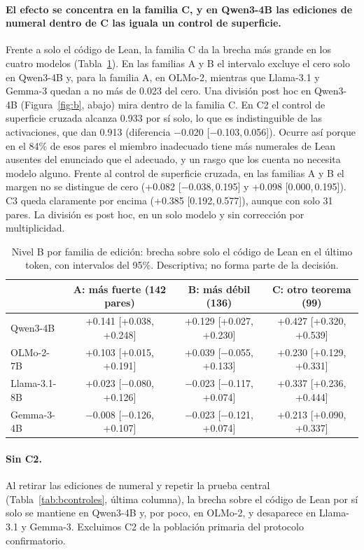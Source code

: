 \documentclass[10pt]{article}
\newcommand{\ic}[2]{[#1,\,#2]}
\begin{document}
\paragraph{El efecto se concentra en la familia C, y en Qwen3-4B las ediciones de numeral dentro de C las iguala un control de superficie.}
Frente a solo el código de Lean, la familia C da la brecha más grande en los cuatro modelos (Tabla~\ref{tab:bfam}). En las
familias A y B el intervalo excluye el cero solo en Qwen3-4B y, para la familia A, en OLMo-2, mientras que
Llama-3.1 y Gemma-3 quedan a no más de 0.023 del cero.
Una división post hoc en Qwen3-4B (Figura~\ref{fig:b}, abajo) mira dentro de la familia C. En C2 el control de superficie cruzada
alcanza 0.933 por sí solo, lo que es indistinguible de las activaciones, que dan 0.913 (diferencia −0.020
\ic{−0.103}{0.056}). Ocurre así porque en el 84\% de esos pares el miembro inadecuado tiene más numerales de Lean
ausentes del enunciado que el adecuado, y un rasgo que los cuenta no necesita modelo alguno. Frente al
control de superficie cruzada, en las familias A y B el margen no se distingue de cero (+0.082 \ic{−0.038}{0.195} y +0.098
\ic{0.000}{0.195}). C3 queda claramente por encima (+0.385 \ic{0.192}{0.577}), aunque con solo 31 pares. La
división es post hoc, en un solo modelo y sin corrección por multiplicidad.


\begin{table}[h]
\centering
\caption{Nivel B por familia de edición: brecha sobre solo el código de Lean en el último token, con intervalos del 95\%. Descriptiva; no forma parte de la decisión.}
\label{tab:bfam}
\vspace{2pt}
{\small
\begin{tabular}{@{}lccc@{}}
\toprule
 & A: más fuerte (142 pares) & B: más débil (136) & C: otro teorema (99)\\
\midrule
Qwen3-4B     & +0.141 [+0.038, +0.248] & +0.129 [+0.027, +0.230] & +0.427 [+0.320, +0.539]\\
OLMo-2-7B    & +0.103 [+0.015, +0.191] & +0.039 [−0.055, +0.133] & +0.230 [+0.129, +0.331]\\
Llama-3.1-8B & +0.023 [−0.080, +0.126] & −0.023 [−0.117, +0.074] & +0.337 [+0.236, +0.444]\\
Gemma-3-4B   & −0.008 [−0.126, +0.107] & −0.023 [−0.121, +0.074] & +0.213 [+0.090, +0.337]\\
\bottomrule
\end{tabular}}
\end{table}

\paragraph{Sin C2.}
Al retirar las ediciones de numeral y repetir la prueba central (Tabla~\ref{tab:bcontroles}, última columna), la
brecha sobre el código de Lean por sí solo se mantiene en Qwen3-4B y, por poco, en OLMo-2, y desaparece en Llama-3.1 y Gemma-3. Excluimos C2
de la población primaria del protocolo confirmatorio.
\end{document}
